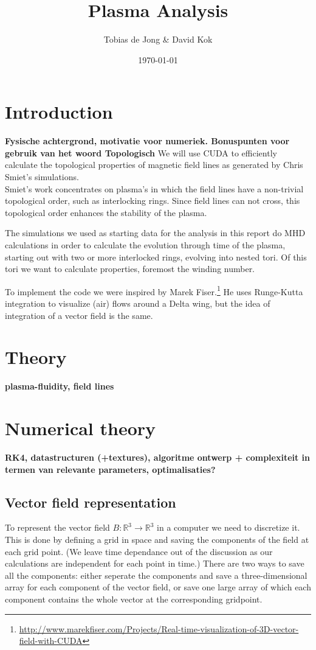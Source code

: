 \documentclass{article}
\begin{document}
\title{Plasma Analysis}
\author{Tobias de Jong \& David Kok}
\date{\today}
\maketitle
\section{Introduction}
{\bf Fysische achtergrond, motivatie voor numeriek. Bonuspunten voor gebruik van het woord Topologisch }
We will use CUDA to efficiently calculate the topological properties of magnetic field lines as generated by Chris Smiet's simulations.\cite{PhysRevLett.115.095001}\\
Smiet's work concentrates on plasma's in which the field lines have a non-trivial topological order, such as interlocking rings. Since field lines can not cross, this topological order enhances the stability of the plasma.

The simulations we used as starting data for the analysis in this report do MHD calculations in order to calculate the evolution through time of the plasma, starting out with two or more interlocked rings, evolving into nested tori.
Of this tori we want to calculate properties, foremost the winding number.

To implement the code we were inspired by Marek Fiser.\footnote{\url{http://www.marekfiser.com/Projects/Real-time-visualization-of-3D-vector-field-with-CUDA}} He uses Runge-Kutta integration to visualize (air) flows around a Delta wing, but the idea of integration of a vector field is the same.
\section{Theory}
{\bf plasma-fluidity, field lines }
\section{Numerical theory}
{\bf RK4, datastructuren (+textures), algoritme ontwerp + complexiteit in termen van relevante parameters, optimalisaties?}
\subsection{Vector field representation}
To represent the vector field $B: \mathbb{R}^3 \to \mathbb{R}^3$ in a computer we need to discretize it. This is done by defining a grid in space and saving the components of the field at each grid point. (We leave time dependance out of the discussion as our calculations are independent for each point in time.) There are two ways to save all the components: either seperate the components and save a three-dimensional array for each component of the vector field, or save one large array of which each component contains the whole vector at the corresponding gridpoint.
\end{document}
